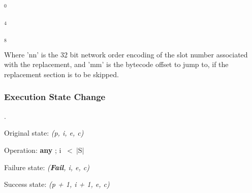 $_0$\ 


$_4$\ 

$_8$\ 
\fbox{%
  \parbox{20pt}{%
mm
  }%
}

Where 'nn' is the 32 bit network order encoding of the slot number
associated with the replacement, and 'mm' is the bytecode offset
to jump to, if the replacement section is to be skipped.

\subsubsection{Execution State Change}

.

Original state: \textit{(p, i, e, c)}

Operation: \textbf{any} ; i \ \textless \ $\vert$S$\vert$

Failure state: \textit{(\textbf{Fail}, i, e, c)}

Success state: \textit{(p + 1, i + 1, e, c)}


